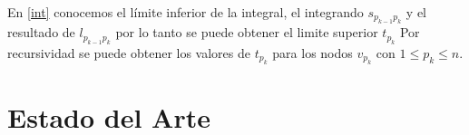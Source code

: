 \documentclass[letter, 10pt]{article}
\begin{document}
En \eqref{int} conocemos el límite inferior de la integral, el integrando $ s_{p_{k-1}p_k}$ y el resultado de $ l_{p_{k-1}p_k} $ por lo tanto se puede obtener el limite superior $t_{p_k}$
Por recursividad se puede obtener los valores de $t_{p_k}$ para los nodos $v_{p_k}$ con  $1\leq p_k \leq n$.

\section{Estado del Arte}
\end{document}
